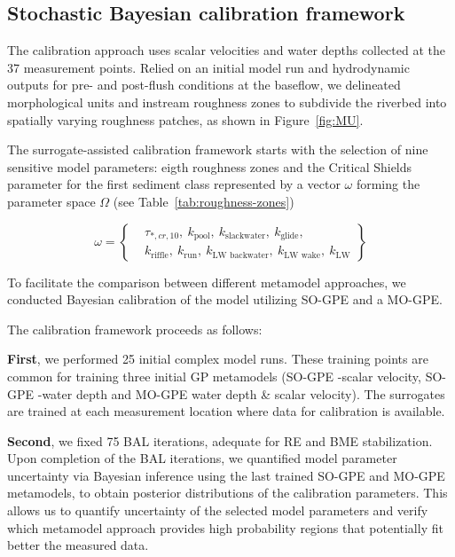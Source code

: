 \documentclass[draft,linenumbers,onecolumn]{agujournal2019} %
\begin{document}
\subsection{Stochastic Bayesian calibration framework}
\label{sec:bayes-cal}

The calibration approach uses scalar velocities and water depths collected at the 37 measurement points. Relied on an initial model run and hydrodynamic outputs for pre- and post-flush conditions at the baseflow, we delineated morphological units and instream roughness zones to subdivide the riverbed into spatially varying roughness patches, as shown in Figure~\ref{fig:MU}. 

The surrogate-assisted calibration framework starts with the selection of nine sensitive model parameters: eigth roughness zones and the Critical Shields parameter for the first sediment class represented by a vector $\omega$ forming the parameter space $\Omega$ (see Table~\ref{tab:roughness-zones})

\begin{equation} \label{eq:omega}
	\omega = \left\{
	\begin{split}
		&\tau_{*,cr,10},\ k_{\text{pool}},\ k_{\text{slackwater}},\ k_{\text{glide}}, \\
		&k_{\text{riffle}},\ k_{\text{run}},\ k_{\text{LW backwater}},\ k_{\text{LW wake}},\ k_{\text{LW}}
	\end{split}
	\right\}
\end{equation}



To facilitate the comparison between different metamodel approaches, we conducted Bayesian calibration of the model utilizing SO-GPE and a MO-GPE.

The calibration framework proceeds as follows:

\textbf{First}, we performed 25 initial complex model runs. These training points are common for training three initial GP metamodels (SO-GPE -scalar velocity, SO-GPE -water depth and MO-GPE water depth \& scalar velocity). The surrogates are trained at each measurement location where data for calibration is available.

\textbf{Second}, we fixed 75 BAL iterations, adequate for RE and BME stabilization. Upon completion of the BAL iterations, we quantified model parameter uncertainty via Bayesian inference using the last trained SO-GPE and MO-GPE metamodels,  to obtain posterior distributions of the calibration parameters. This allows us to quantify uncertainty of the selected model parameters and verify which metamodel approach provides high probability regions that potentially fit better the measured data. 
\end{document}
